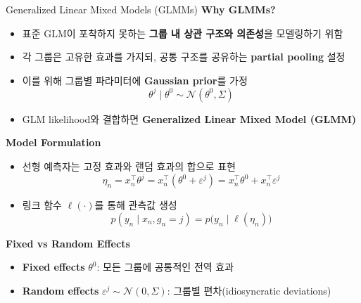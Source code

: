 \documentclass[xcolor=dvipsnames,t,9pt]{beamer}
\begin{document}
\begin{frame}{Generalized Linear Mixed Models (GLMMs)}
    \vspace{-0.3em}
    \textbf{Why GLMMs?}
    \begin{itemize}
        \item 표준 GLM이 포착하지 못하는 \textbf{그룹 내 상관 구조와 의존성}을 모델링하기 위함
        \item 각 그룹은 고유한 효과를 가지되, 공통 구조를 공유하는 \textbf{partial pooling} 설정
        \item 이를 위해 그룹별 파라미터에 \textbf{Gaussian prior}를 가정
        \[
        \theta^j \mid \theta^0 \sim \mathcal{N}(\theta^0, \Sigma)
        \]
        \item GLM likelihood와 결합하면 \textbf{Generalized Linear Mixed Model (GLMM)}
    \end{itemize}
    \vspace{0.5em}
    \textbf{Model Formulation}
    \begin{itemize}
        \item 선형 예측자는 고정 효과와 랜덤 효과의 합으로 표현
        \[
        \eta_n
        = x_n^\top \theta^j
        = x_n^\top(\theta^0 + \varepsilon^j)
        = x_n^\top \theta^0 + x_n^\top \varepsilon^j
        \]
        \item 링크 함수 $\ell(\cdot)$를 통해 관측값 생성
        \[
        p(y_n \mid x_n, g_n=j)
        = p\bigl(y_n \mid \ell(\eta_n)\bigr)
        \]
    \end{itemize}
    \vspace{0.3em}
    \textbf{Fixed vs Random Effects}
    \begin{itemize}
        \item \textbf{Fixed effects} $\theta^0$: 모든 그룹에 공통적인 전역 효과
        \item \textbf{Random effects} $\varepsilon^j \sim \mathcal{N}(0,\Sigma)$:
        그룹별 편차(idiosyncratic deviations)
    \end{itemize}
    
\end{frame}

\end{document}
